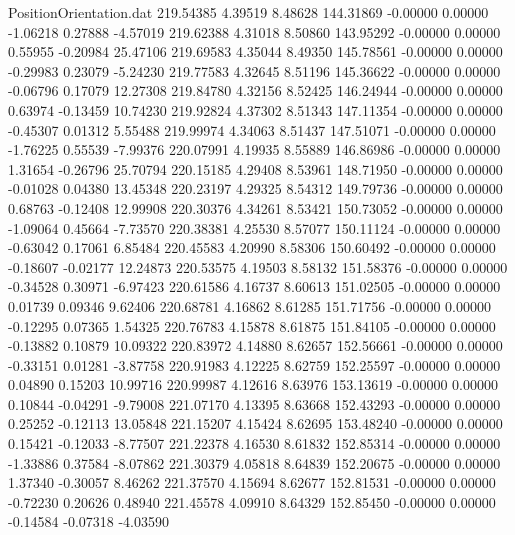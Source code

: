 \begin{filecontents}{PositionOrientation.dat}
 219.54385    4.39519    8.48628   144.31869   -0.00000    0.00000   -1.06218    0.27888   -4.57019
 219.62388    4.31018    8.50860   143.95292   -0.00000    0.00000    0.55955   -0.20984   25.47106
 219.69583    4.35044    8.49350   145.78561   -0.00000    0.00000   -0.29983    0.23079   -5.24230
 219.77583    4.32645    8.51196   145.36622   -0.00000    0.00000   -0.06796    0.17079   12.27308
 219.84780    4.32156    8.52425   146.24944   -0.00000    0.00000    0.63974   -0.13459   10.74230
 219.92824    4.37302    8.51343   147.11354   -0.00000    0.00000   -0.45307    0.01312    5.55488
 219.99974    4.34063    8.51437   147.51071   -0.00000    0.00000   -1.76225    0.55539   -7.99376
 220.07991    4.19935    8.55889   146.86986   -0.00000    0.00000    1.31654   -0.26796   25.70794
 220.15185    4.29408    8.53961   148.71950   -0.00000    0.00000   -0.01028    0.04380   13.45348
 220.23197    4.29325    8.54312   149.79736   -0.00000    0.00000    0.68763   -0.12408   12.99908
 220.30376    4.34261    8.53421   150.73052   -0.00000    0.00000   -1.09064    0.45664   -7.73570
 220.38381    4.25530    8.57077   150.11124   -0.00000    0.00000   -0.63042    0.17061    6.85484
 220.45583    4.20990    8.58306   150.60492   -0.00000    0.00000   -0.18607   -0.02177   12.24873
 220.53575    4.19503    8.58132   151.58376   -0.00000    0.00000   -0.34528    0.30971   -6.97423
 220.61586    4.16737    8.60613   151.02505   -0.00000    0.00000    0.01739    0.09346    9.62406
 220.68781    4.16862    8.61285   151.71756   -0.00000    0.00000   -0.12295    0.07365    1.54325
 220.76783    4.15878    8.61875   151.84105   -0.00000    0.00000   -0.13882    0.10879   10.09322
 220.83972    4.14880    8.62657   152.56661   -0.00000    0.00000   -0.33151    0.01281   -3.87758
 220.91983    4.12225    8.62759   152.25597   -0.00000    0.00000    0.04890    0.15203   10.99716
 220.99987    4.12616    8.63976   153.13619   -0.00000    0.00000    0.10844   -0.04291   -9.79008
 221.07170    4.13395    8.63668   152.43293   -0.00000    0.00000    0.25252   -0.12113   13.05848
 221.15207    4.15424    8.62695   153.48240   -0.00000    0.00000    0.15421   -0.12033   -8.77507
 221.22378    4.16530    8.61832   152.85314   -0.00000    0.00000   -1.33886    0.37584   -8.07862
 221.30379    4.05818    8.64839   152.20675   -0.00000    0.00000    1.37340   -0.30057    8.46262
 221.37570    4.15694    8.62677   152.81531   -0.00000    0.00000   -0.72230    0.20626    0.48940
 221.45578    4.09910    8.64329   152.85450   -0.00000    0.00000   -0.14584   -0.07318   -4.03590

\end{filecontents}

